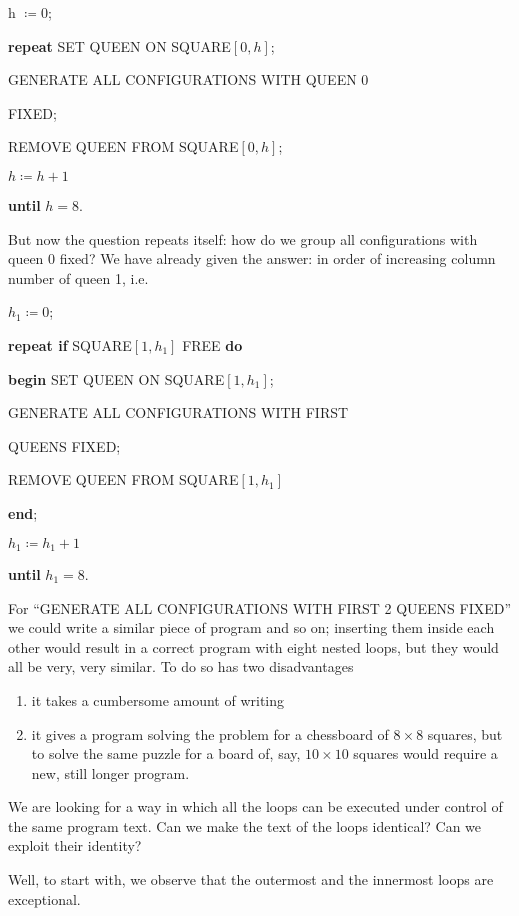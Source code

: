 h $\coloneq 0$;

\textbf{repeat} SET QUEEN ON SQUARE$[0,h]$;

\quad GENERATE ALL CONFIGURATIONS WITH QUEEN 0

\quad\quad FIXED;

\quad REMOVE QUEEN FROM SQUARE$[0,h]$;

\quad $h \coloneq h + 1$

\textbf{until} $h = 8$.

But now the question repeats itself: how do we group all configurations with queen 0 fixed? We have already given the answer: in order of increasing column number of queen 1, i.e.

$h_1 \coloneq 0$;

\textbf{repeat if} SQUARE$[1, h_1]$ FREE \textbf{do}

\quad \textbf{begin} SET QUEEN ON SQUARE$[1, h_1]$;

\quad \quad GENERATE ALL CONFIGURATIONS WITH FIRST

\quad \quad {} QUEENS FIXED;

\quad \quad REMOVE QUEEN FROM SQUARE$[1, h_1]$

\quad \textbf{end};

\quad $h_1 \coloneq h_1 + 1$

\textbf{until} $h_1 = 8$.

For ``GENERATE ALL CONFIGURATIONS WITH FIRST 2 QUEENS FIXED'' we could write a similar piece of program and so on; inserting
them inside each other would result in a correct program with eight nested loops, but they would all be very, very similar. To do so has two disadvantages

\begin{enumerate}[leftmargin=2\parindent, label=(\arabic*)]
	\item it takes a cumbersome amount of writing
	\item it gives a program solving the problem for a chessboard of $8\times 8$ squares, but to solve the same puzzle for a board of, say, $10\times 10$ squares would require a new, still longer program.
\end{enumerate}

We are looking for a way in which all the loops can be executed under control of the same program text. Can we make the text of the loops identical? Can we exploit their identity?

Well, to start with, we observe that the outermost and the innermost loops are exceptional.


